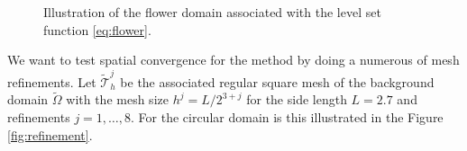 \documentclass[11pt]{article}
\theoremstyle{remark}
\numberwithin{equation}{section}
\begin{document}
\begin{figure}[h!]
    \centering
{}
\caption{Illustration of the flower domain associated with the level set function \eqref{eq:flower}.}
    \label{fig:flower}
\end{figure}


We want to test spatial convergence for the method by doing a numerous of mesh refinements. Let $ \widetilde{\mathcal{T}}_{h}^{j} $ be the associated regular square mesh of the background domain $\widetilde{\Omega }$ with the mesh size  $h^{j} = L/2^{3+j} $
for the side length $L=2.7$ and refinements
$j=1, \ldots, 8$. For the circular domain is this illustrated in the Figure \ref{fig:refinement}.
\end{document}
